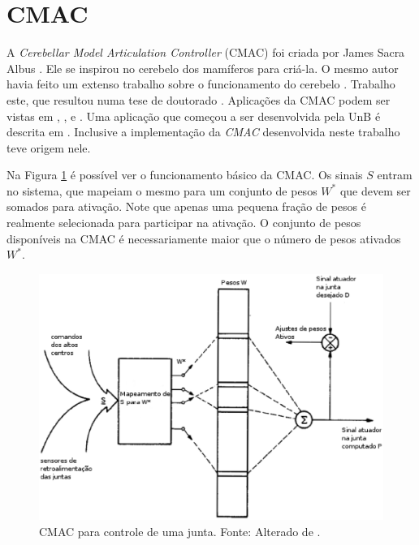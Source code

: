 
\goodbreak
\newpage
\clearpage

\section[CMAC]{CMAC}
\label{cmac_sec}

A \emph{Cerebellar Model Articulation Controller} (CMAC) foi criada por James Sacra Albus \cite{Albus1975b}. 
Ele se inspirou no cerebelo dos mamíferos para criá-la. 
O mesmo autor havia feito um extenso trabalho sobre o funcionamento do cerebelo \cite{Albus1971b}.
Trabalho este, que resultou numa tese de doutorado \cite{Albus1972a}.
Aplicações da CMAC podem ser vistas em \cite{Albus1975d}, \cite{Albus1979}, \cite{Sabourin2006a} e \cite{Lin2002a}.
Uma aplicação que começou a ser desenvolvida pela UnB é descrita em . Inclusive a implementação da \emph{CMAC} desenvolvida neste trabalho teve origem nele.

Na Figura \ref{fig1} é possível ver o funcionamento básico da CMAC. Os sinais $S$ entram no sistema, que mapeiam o mesmo para um conjunto de pesos $W^*$ que devem ser somados para ativação. 
Note que apenas uma pequena fração de pesos é realmente selecionada para participar na ativação. 
O conjunto de pesos disponíveis na CMAC é necessariamente maior que o número de pesos ativados $W^*$. 

\begin{figure}[H]
	\centering
	\includegraphics[width=15 cm]{figuras/cmac1.eps}
	\caption{CMAC para controle de uma junta. Fonte: Alterado de .}
    	\label{fig1}
\end{figure}



